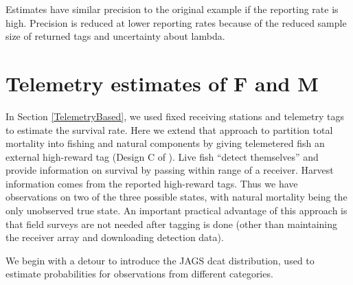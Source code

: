 \documentclass[
]{krantz}
\begin{document}
Estimates have similar precision to the original example if the reporting rate is high. Precision is reduced at lower reporting rates because of the reduced sample size of returned tags and uncertainty about lambda.

\hypertarget{TelemetryFandM}{%
\section{Telemetry estimates of F and M}\label{TelemetryFandM}}

In Section \ref{TelemetryBased}, we used fixed receiving stations and telemetry tags to estimate the survival rate. Here we extend that approach to partition total mortality into fishing and natural components by giving telemetered fish an external high-reward tag (Design C of \citet{hightower.harris2017}). Live fish ``detect themselves'' and provide information on survival by passing within range of a receiver. Harvest information comes from the reported high-reward tags. Thus we have observations on two of the three possible states, with natural mortality being the only unobserved true state. An important practical advantage of this approach is that field surveys are not needed after tagging is done (other than maintaining the receiver array and downloading detection data).

We begin with a detour to introduce the JAGS dcat distribution, used to estimate probabilities for observations from different categories.
\end{document}
